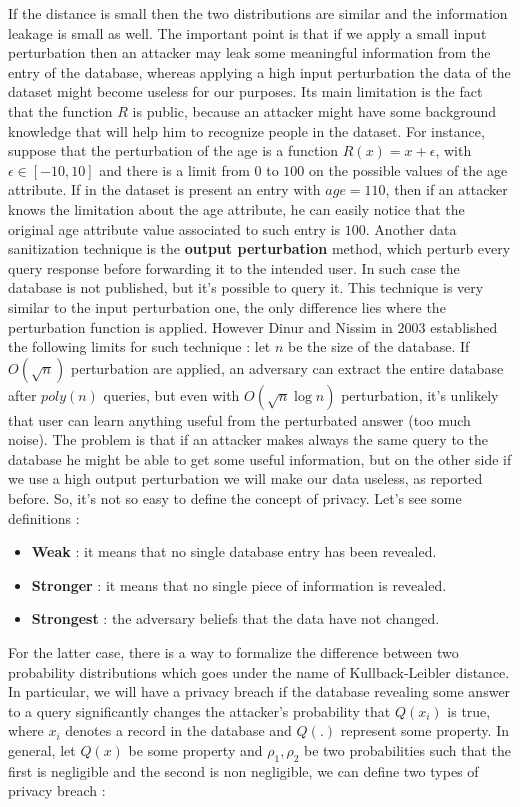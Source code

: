If the distance is small then the two distributions are similar and the information leakage is small as well. The important point is that if we apply a small input perturbation then an attacker may leak some meaningful information from the entry of the database, whereas applying a high input perturbation the data of the dataset might become useless for our purposes. Its main limitation is the fact that the function $R$ is public, because an attacker might have some background knowledge that will help him to recognize people in the dataset. For instance, suppose that the perturbation of the age is a function $R(x) = x + \epsilon$, with $\epsilon \in [-10, 10]$ and there is a limit from $0$ to $100$ on the possible values of the age attribute. If in the dataset is present an entry with $age = 110$, then if an attacker knows the limitation about the age attribute, he can easily notice that the original age attribute value associated to such entry is $100$. Another data sanitization technique is the \textbf{output perturbation} method, which perturb every query response before forwarding it to the intended user. In such case the database is not published, but it's possible to query it. This technique is very similar to the input perturbation one, the only difference lies where the perturbation function is applied. However Dinur and Nissim in $2003$ established the following limits for such technique : let $n$ be the size of the database. If $O(\sqrt{n})$ perturbation are applied, an adversary can extract the entire database after $poly(n)$ queries, but even with $O(\sqrt{n}\log n)$ perturbation, it's unlikely that user can learn anything useful from the perturbated answer (too much noise). The problem is that if an attacker makes always the same query to the database he might be able to get some useful information, but on the other side if we use a high output perturbation we will make our data useless, as reported before. So, it's not so easy to define the concept of privacy. Let's see some definitions :
\begin{itemize}
\item \textbf{Weak} : it means that no single database entry has been revealed.
\item \textbf{Stronger} : it means that no single piece of information is revealed.
\item \textbf{Strongest} : the adversary beliefs that the data have not changed.
\end{itemize}
For the latter case, there is a way to formalize the difference between two probability distributions which goes under the name of Kullback-Leibler distance. In particular, we will have a privacy breach if the database revealing some answer to a query significantly changes the attacker's probability that $Q(x_{i})$ is true, where $x_{i}$ denotes a record in the database and $Q(.)$ represent some property. In general, let $Q(x)$ be some property and $\rho_{1}, \rho_{2}$ be two probabilities such that the first is negligible and the second is non negligible, we can define two types of privacy breach :
